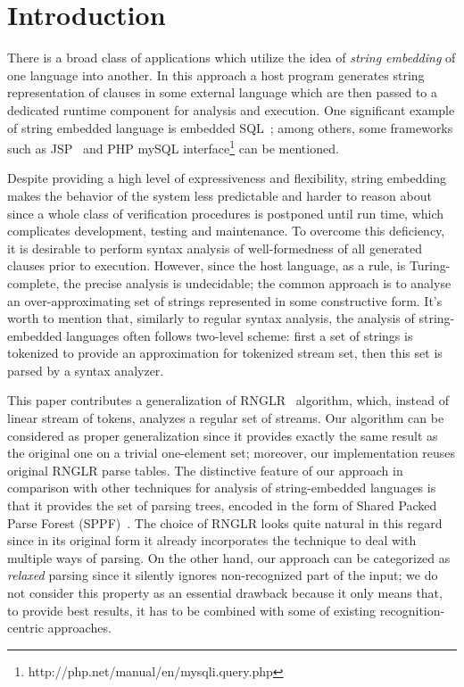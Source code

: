 \section*{Introduction}
There is a broad class of applications which utilize the idea of \emph{string embedding} of one 
language into another. In this approach a host program generates string representation of 
clauses in some external language which are then passed to a dedicated runtime 
component for analysis and execution. One significant example of string embedded 
language is embedded SQL~\cite{DSQLISO}; among others, some frameworks 
such as JSP~\cite{JSP} and PHP mySQL interface\footnote{http://php.net/manual/en/mysqli.query.php} 
can be mentioned.

Despite providing a high level of expressiveness and flexibility, string embedding makes the 
behavior of the system less predictable and harder to reason about since a whole class of 
verification procedures is postponed until run time, which complicates development, 
testing and maintenance. To overcome this deficiency, it is desirable to perform syntax 
analysis of well-formedness of all generated clauses prior to execution. However, since the 
host language, as a rule, is Turing-complete, the precise analysis is undecidable; the common 
approach is to analyse an over-approximating set of strings represented in some constructive form. 
It's worth to mention that, similarly to regular syntax analysis, the analysis of string-embedded 
languages often follows two-level scheme: first a set of strings is tokenized to provide an 
approximation for tokenized stream set, then this set is parsed by a syntax analyzer.

This paper contributes a generalization of RNGLR~\cite{RNGLR} algorithm, which, instead of
linear stream of tokens, analyzes a regular set of streams. Our algorithm can be considered as
proper generalization since it provides exactly the same result as the original one on a
trivial one-element set; moreover, our implementation reuses original RNGLR parse tables. The distinctive 
feature of our approach in comparison with other techniques for analysis of string-embedded 
languages is that it provides the set of parsing trees, encoded in the form of Shared Packed 
Parse Forest (SPPF)~\cite{SPPF}. The choice of RNGLR looks quite natural in this regard
since in its original form it already incorporates the technique to deal with multiple
ways of parsing. On the other hand, our approach can be categorized as \emph{relaxed} 
parsing since it silently ignores non-recognized part of the input; we do not consider this 
property as an essential drawback because it only means that, to provide best results,
it has to be combined with some of existing recognition-centric approaches.
